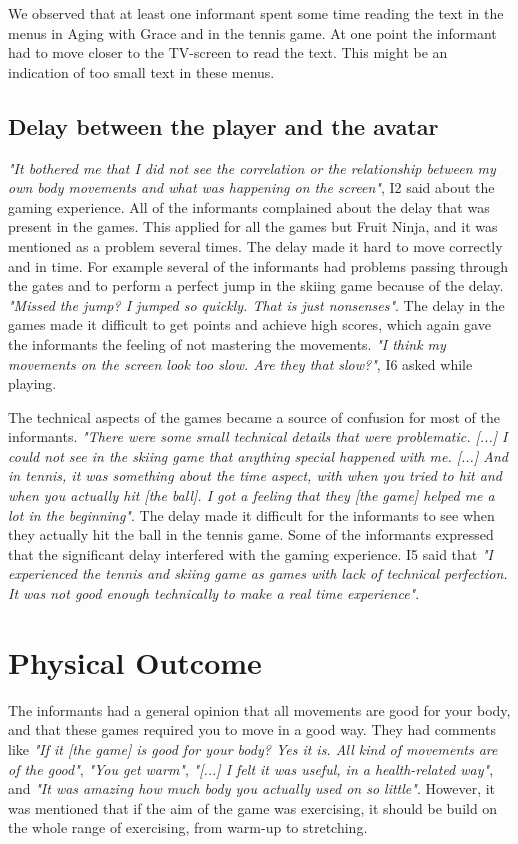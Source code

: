 We observed that at least one informant spent some time reading the text in the menus in Aging with Grace and in the tennis game. At one point the informant had to move closer to the TV-screen to read the text. This might be an indication of too small text in these menus. 

\subsection{Delay between the player and the avatar}

\emph{"It bothered me that I did not see the correlation or the relationship between my own body movements and what was happening on the screen"}, I2 said about the gaming experience. All of the informants complained about the delay that was present in the games. This applied for all the games but Fruit Ninja, and it was mentioned as a problem several times. The delay made it hard to move correctly and in time. For example several of the informants had problems passing through the gates and to perform a perfect jump in the skiing game because of the delay. \emph{"Missed the jump? I jumped so quickly. That is just nonsenses"}. The delay in the games made it difficult to get points and achieve high scores, which again gave the informants the feeling of not mastering the movements. \emph{"I think my movements on the screen look too slow. Are they that slow?"}, I6 asked while playing. 

The technical aspects of the games became a source of confusion for most of the informants. \emph{"There were some small technical details that were problematic. [...] I could not see in the skiing game that anything special happened with me. [...] And in tennis, it was something about the time aspect, with when you tried to hit and when you actually hit [the ball]. I got a feeling that they [the game] helped me a lot in the beginning"}. The delay made it difficult for the informants to see when they actually hit the ball in the tennis game. Some of the informants expressed that the significant delay interfered with the gaming experience. I5 said that \emph{"I experienced the tennis and skiing game as games with lack of technical perfection. It was not good enough technically to make a real time experience"}. 

\section{Physical Outcome}

The informants had a general opinion that all movements are good for your body, and that these games required you to move in a good way. They had comments like \emph{"If it [the game] is good for your body? Yes it is. All kind of movements are of the good"}, \emph{"You get warm"}, \emph{"[...] I felt it was useful, in a health-related way"}, and \emph{"It was amazing how much body you actually used on so little"}. However, it was mentioned that if the aim of the game was exercising, it should be build on the whole range of exercising, from warm-up to stretching. 

